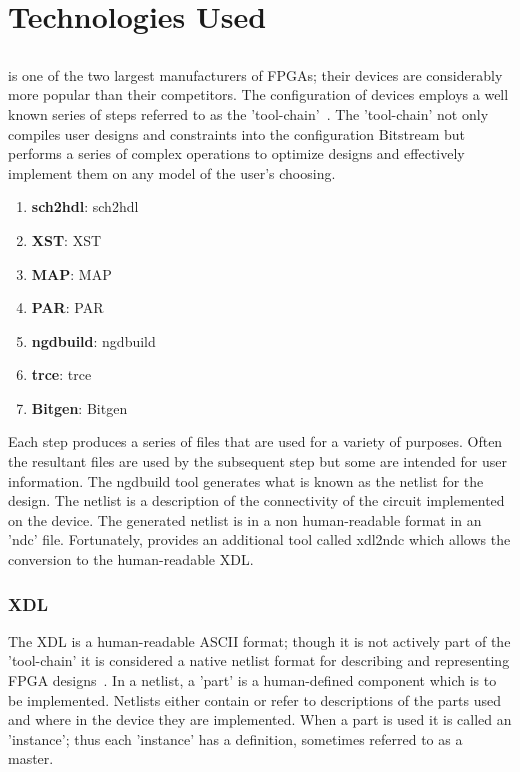 \label{chapter:appendix}

\section{Technologies Used}
\subsection{\Xilinx}
\Xilinx is one of the two largest manufacturers of \acrshort{FPGA}s; their devices are considerably more popular than their competitors.
The configuration of devices employs a well known series of steps referred to as the \Xilinx 'tool-chain'~\cite{xilnxDevManual}.
The 'tool-chain' not only compiles user designs and constraints into the configuration \gls{Bitstream} but performs a series of complex operations to optimize designs and effectively implement them on any \Xilinx model of the user's choosing.
\begin{enumerate}
	\item \textbf{\gls{sch2hdl}}: \glsdesc{sch2hdl}
	\item \textbf{\gls{XST}}: \glsdesc{XST}
	\item \textbf{\gls{MAP}}: \glsdesc{MAP}
	\item \textbf{\gls{PAR}}: \glsdesc{PAR}
	\item \textbf{\gls{ngdbuild}}: \glsdesc{ngdbuild}
	\item \textbf{\gls{trce}}: \glsdesc{trce}
	\item \textbf{\gls{Bitgen}}: \glsdesc{Bitgen}
\end{enumerate}
Each step produces a series of files that are used for a variety of purposes. 
Often the resultant files are used by the subsequent step but some are intended for user information.
The \gls{ngdbuild} tool generates what is known as the netlist for the design.
The netlist is a description of the connectivity of the circuit implemented on the device. 
The generated netlist is in a non human-readable format in an 'ndc' file.
Fortunately, \Xilinx provides an additional tool called \gls{xdl2ndc} which allows the conversion to the human-readable \acrfull{XDL}.
\subsubsection{\acrfull{XDL}} \label{sec:XDL}
The \acrfull{XDL} is a human-readable ASCII format; though it is not actively part of the 'tool-chain' it is considered a native netlist format for describing and representing \acrshort{FPGA} designs~\cite{xdlTutorial}. 
In a netlist, a 'part' is a human-defined component which is to be implemented.
Netlists either contain or refer to descriptions of the parts used and where in the device they are implemented.
When a part is used it is called an 'instance'; thus each 'instance' has a definition, sometimes referred to as a master.

